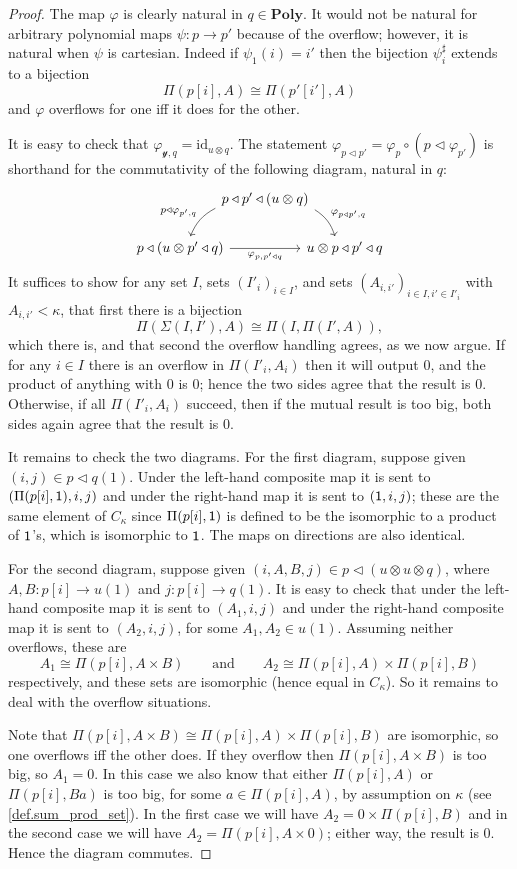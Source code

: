 \documentclass[11pt, one side, article]{memoir}
\theoremstyle{definition}
\theoremstyle{plain}
\newcommand{\Cat}[1]{\mathbf{#1}}%
\newcommand{\id}{\mathrm{id}}
\newcommand{\yon}{\mathcal{y}}
\newcommand{\poly}{\Cat{Poly}}
\newcommand{\0}{\textsf{0}}
\newcommand{\1}{\tn{\textsf{1}}}
\newcommand{\tri}{\mathbin{\triangleleft}}
\newcommand{\qqand}{\qquad\text{and}\qquad}
\begin{document}
\begin{proof}
The map $\varphi$ is clearly natural in $q\in\poly$. It would not be natural for arbitrary polynomial maps $\psi\colon p\to p'$ because of the overflow; however, it is natural when $\psi$ is cartesian. Indeed if $\psi_1(i)=i'$ then the bijection $\psi_i^\sharp$ extends to a bijection
\[\Pi(p[i],A)\cong\Pi(p'[i'],A)\]
and $\varphi$ overflows for one iff it does for the other.

It is easy to check that $\varphi_{\yon,q}=\id_{u\otimes q}$. The statement $\varphi_{p\tri p'}=\varphi_{p}\circ (p\tri\varphi_{p'})$ is shorthand for the commutativity of the following diagram, natural in $q$:
\[
\begin{tikzcd}[column sep=-10pt]
	&p\tri p'\tri(u\otimes q)\ar[dl, bend right=20pt, "p\tri\varphi_{p',q}"']\ar[dr, bend left=20pt, "\varphi_{p\tri p',q}"]\\
	p\tri (u\otimes p'\tri q)\ar[rr, "\varphi_{p,p'\tri q}"']&&
	u\otimes p\tri p'\tri q
\end{tikzcd}
\]
It suffices to show for any set $I$, sets $(I'_i)_{i\in I}$, and sets $(A_{i,i'})_{i\in I, i'\in I'_i}$ with $A_{i,i'}<\kappa$, that first there is a bijection
\[
	\Pi(\Sigma(I,I'),A)\cong\Pi(I,\Pi(I',A)),
\]
which there is, and that second the overflow handling agrees, as we now argue. If for any $i\in I$ there is an overflow in $\Pi(I'_i,A_i)$ then it will output $0$, and the product of anything with $0$ is $0$; hence the two sides agree that the result is $0$. Otherwise, if all $\Pi(I'_i,A_i)$ succeed, then if the mutual result is too big, both sides again agree that the result is $0$.

It remains to check the two diagrams. For the first diagram, suppose given $(i,j)\in p\tri q(1)$. Under the left-hand composite map it is sent to $(\Pi(p[i],\1),i,j)$ and under the right-hand map it is sent to $(\1,i,j)$; these are the same element of $C_\kappa$  since $\Pi(p[i],\1)$ is defined to be the isomorphic to a product of $\1$'s, which is isomorphic to $\1$. The maps on directions are also identical.

For the second diagram, suppose given $(i,A,B,j)\in p\tri(u\otimes u\otimes q)$, where $A,B\colon p[i]\to u(1)$ and $j\colon p[i]\to q(1)$. It is easy to check that under the left-hand composite map it is sent to $(A_1,i,j)$ and under the right-hand composite map it is sent to $(A_2,i,j)$, for some $A_1,A_2\in u(1)$. Assuming neither overflows, these are 
\[
  A_1\cong\Pi(p[i],A\times B)
  \qqand
	A_2\cong\Pi(p[i],A)\times\Pi(p[i],B)
\] 
respectively, and these sets are isomorphic (hence equal in $C_\kappa$). So it remains to deal with the overflow situations.

Note that $\Pi(p[i],A\times B)\cong\Pi(p[i],A)\times\Pi(p[i],B)$ are isomorphic, so one overflows iff the other does. If they overflow then $\Pi(p[i],A\times B)$ is too big, so $A_1=0$. In this case we also know that either $\Pi(p[i],A)$ or $\Pi(p[i],Ba)$ is too big, for some $a\in\Pi(p[i],A)$, by assumption on $\kappa$ (see \cref{def.sum_prod_set}). In the first case we will have $A_2=0\times\Pi(p[i],B)$ and in the second case we will have $A_2=\Pi(p[i],A\times 0)$; either way, the result is $0$. Hence the diagram commutes.
\end{proof}
\end{document}
